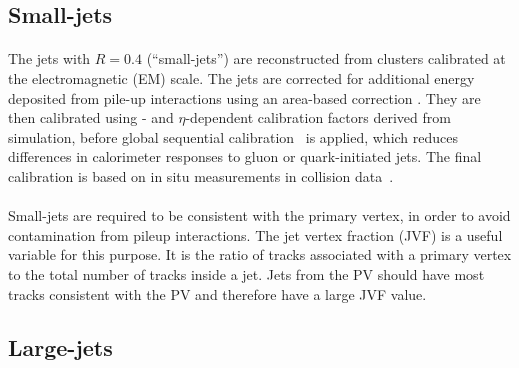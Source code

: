 \subsection{Small-\R jets}
\paragraph{}
The jets with $R=0.4$ (``small-\R jets'') are reconstructed from clusters calibrated at the electromagnetic (EM) scale. The jets are corrected for additional energy deposited from pile-up interactions using an area-based correction \cite{Cacciari:2008gn}. 
They are then calibrated using \pt- and $\eta$-dependent calibration factors derived from simulation, before global sequential calibration~\cite{Aad:2011he} is applied, which reduces differences in calorimeter responses to gluon or quark-initiated jets. 
The final calibration is based on in situ measurements in collision data~\cite{ATL-PHYS-PUB-2015-015}.

\paragraph{}
Small-\R jets are required to be consistent with the primary vertex, in order to avoid contamination from pileup interactions. 
The jet vertex fraction (JVF) is a useful variable for this purpose. 
It is the ratio of tracks associated with a primary vertex to the total number of tracks inside a jet. 
Jets from the PV should have most tracks consistent with the PV and therefore have a large JVF value.

\subsection{Large-\R jets}
\label{obj:largeRjet}

